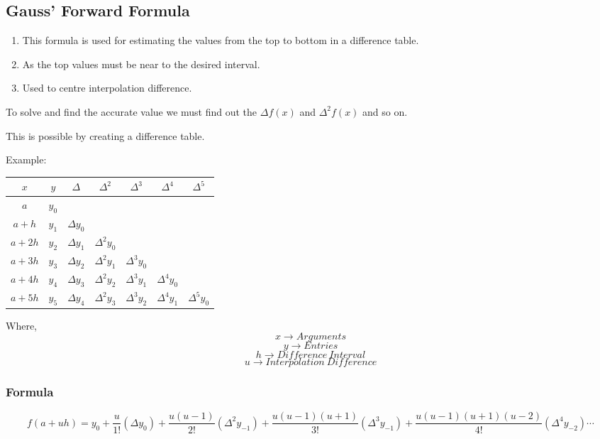 \subsection{Gauss' Forward Formula}

\begin{enumerate}
    \item This formula is used for estimating the values from the top to bottom in a difference table.
    \item As the top values must be near to the desired interval.
    \item Used to centre interpolation difference.
\end{enumerate}

To solve and find the accurate value we must find out the $\Delta f(x)$ and $\Delta^2 f(x)$ and so on.

This is possible by creating a difference table.

Example:

\begin{center}
    \begin{tabular}{|c|c|c|c|c|c|c|}
        \hline
        $x$ & $y$ & $\Delta$ & $\Delta^2$ & $\Delta^3$ & $\Delta^4$ & $\Delta^5$\\
        \hline
        $a$ & $y_0$ & & & & &\\
        \hline
        $a + h$ & $y_1$ & $\Delta y_0$ & & & &\\
        \hline
        $a + 2h$ & $y_2$ & $\Delta y_1$ & $\Delta^2 y_0$ & & &\\
        \hline
        $a + 3h$ & $y_3$ & $\Delta y_2$ & $\Delta^2 y_1$ & $\Delta^3 y_0$ & &\\
        \hline
        $a + 4h$ & $y_4$ & $\Delta y_3$ & $\Delta^2 y_2$ & $\Delta^3 y_1$ & $\Delta^4 y_0$ &\\
        \hline
        $a + 5h$ & $y_5$ & $\Delta y_4$ & $\Delta^2 y_3$ & $\Delta^3 y_2$ & $\Delta^4 y_1$ & $\Delta^5 y_0$\\
        \hline
    \end{tabular}
    \end{center}

Where,\\
\[x \rightarrow Arguments\]
\[y \rightarrow Entries\]
\[h \rightarrow Difference\ Interval\]
\[u \rightarrow Interpolation\ Difference\]


\subsubsection{Formula}

\[f(a + uh) = y_0 + \frac{u}{1!}(\Delta {y}_{0}) + \frac{u(u-1)}{2!}(\Delta^2 {y}_{-1}) + \frac{u(u-1)(u+1)}{3!}(\Delta^3 {y}_{-1}) + \frac{u(u-1)(u+1)(u-2)}{4!}(\Delta^4 {y}_{-2}) \cdots\]
